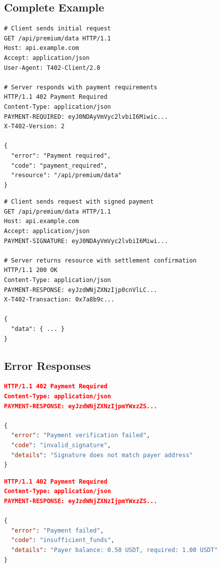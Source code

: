 \subsection{Complete Example}

\begin{lstlisting}[caption={Phase 1: Initial request and 402 response}]
# Client sends initial request
GET /api/premium/data HTTP/1.1
Host: api.example.com
Accept: application/json
User-Agent: T402-Client/2.0

# Server responds with payment requirements
HTTP/1.1 402 Payment Required
Content-Type: application/json
PAYMENT-REQUIRED: eyJ0NDAyVmVyc2lvbiI6Miwic...
X-T402-Version: 2

{
  "error": "Payment required",
  "code": "payment_required",
  "resource": "/api/premium/data"
}
\end{lstlisting}

\begin{lstlisting}[caption={Phase 2: Request with payment}]
# Client sends request with signed payment
GET /api/premium/data HTTP/1.1
Host: api.example.com
Accept: application/json
PAYMENT-SIGNATURE: eyJ0NDAyVmVyc2lvbiI6Miwi...

# Server returns resource with settlement confirmation
HTTP/1.1 200 OK
Content-Type: application/json
PAYMENT-RESPONSE: eyJzdWNjZXNzIjp0cnVlLC...
X-T402-Transaction: 0x7a8b9c...

{
  "data": { ... }
}
\end{lstlisting}

\subsection{Error Responses}

\begin{lstlisting}[language=json,caption={Payment verification failed}]
HTTP/1.1 402 Payment Required
Content-Type: application/json
PAYMENT-RESPONSE: eyJzdWNjZXNzIjpmYWxzZS...

{
  "error": "Payment verification failed",
  "code": "invalid_signature",
  "details": "Signature does not match payer address"
}
\end{lstlisting}

\begin{lstlisting}[language=json,caption={Insufficient funds}]
HTTP/1.1 402 Payment Required
Content-Type: application/json
PAYMENT-RESPONSE: eyJzdWNjZXNzIjpmYWxzZS...

{
  "error": "Payment failed",
  "code": "insufficient_funds",
  "details": "Payer balance: 0.50 USDT, required: 1.00 USDT"
}
\end{lstlisting}

